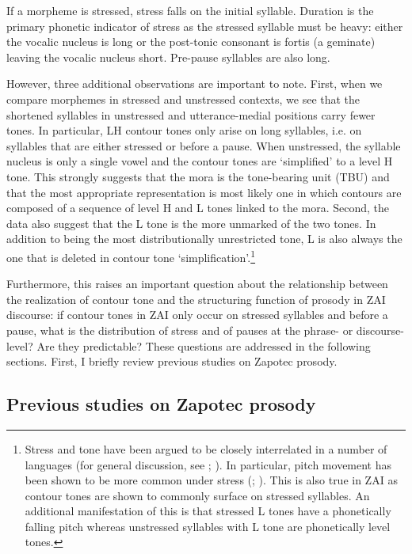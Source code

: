 If a morpheme is stressed, stress falls on the initial syllable. Duration is the primary phonetic indicator of stress as the stressed syllable must be heavy: either the vocalic nucleus is long or the post-tonic consonant is fortis (a geminate) leaving the vocalic nucleus short. Pre-pause syllables are also long.

However, three additional observations are important to note. First, when we compare morphemes in stressed and unstressed contexts, we see that the shortened syllables in unstressed and utterance-medial positions carry fewer tones. In particular, LH contour tones only arise on long syllables, i.e. on syllables that are either stressed or before a pause. When unstressed, the syllable nucleus is only a single vowel and the contour tones are `simplified' to a level H tone. This strongly suggests that the mora is the tone-bearing unit (TBU) and that the most appropriate representation is most likely one in which contours are composed of a sequence of level H and L tones linked to the mora. Second, the data also suggest that the L tone is the more unmarked of the two tones. In addition to being the most distributionally unrestricted tone, L is also always the one that is deleted in contour tone `simplification'.\footnote{Stress and tone have been argued to be closely interrelated in a number of languages (for general discussion, see \citealt{yip2002}; \citealt{zhang2002}). In particular, pitch movement has been shown to be more common under stress (\citealt{zhang2002};  \citealt{zoll2003}). This is also true in ZAI as contour tones are shown to commonly surface on stressed syllables. An additional manifestation of this is that stressed L tones have a phonetically falling pitch whereas unstressed syllables with L tone are phonetically level tones.} 

Furthermore, this raises an important question about the relationship between the realization of contour tone and the structuring function of prosody in ZAI discourse: if contour tones in ZAI only occur on stressed syllables and before a pause, what is the distribution of stress and of pauses at the phrase- or discourse-level? Are they predictable? These questions are addressed in the following sections. First, I briefly review previous studies on Zapotec prosody.


\subsection{Previous studies on Zapotec prosody}

